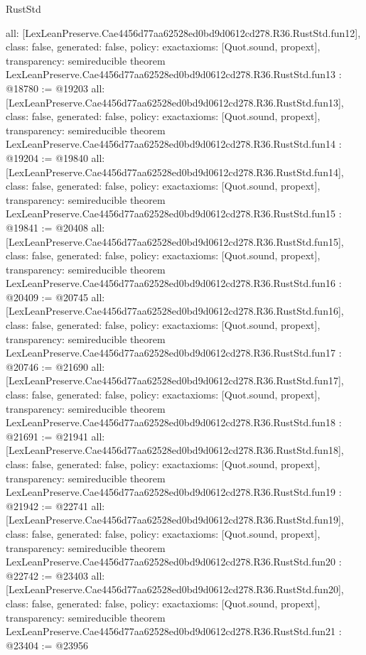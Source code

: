 \begin{lexlean}{RustStd}
\begin{coremodule}
{  all: [LexLeanPreserve.Cae4456d77aa62528ed0bd9d0612cd278.R36.RustStd.fun12],
  class: false,
  generated: false,
  policy: exact{axioms: [Quot.sound, propext]},
  transparency: semireducible
}
theorem LexLeanPreserve.Cae4456d77aa62528ed0bd9d0612cd278.R36.RustStd.fun13 : @18780 := @19203 {
  all: [LexLeanPreserve.Cae4456d77aa62528ed0bd9d0612cd278.R36.RustStd.fun13],
  class: false,
  generated: false,
  policy: exact{axioms: [Quot.sound, propext]},
  transparency: semireducible
}
theorem LexLeanPreserve.Cae4456d77aa62528ed0bd9d0612cd278.R36.RustStd.fun14 : @19204 := @19840 {
  all: [LexLeanPreserve.Cae4456d77aa62528ed0bd9d0612cd278.R36.RustStd.fun14],
  class: false,
  generated: false,
  policy: exact{axioms: [Quot.sound, propext]},
  transparency: semireducible
}
theorem LexLeanPreserve.Cae4456d77aa62528ed0bd9d0612cd278.R36.RustStd.fun15 : @19841 := @20408 {
  all: [LexLeanPreserve.Cae4456d77aa62528ed0bd9d0612cd278.R36.RustStd.fun15],
  class: false,
  generated: false,
  policy: exact{axioms: [Quot.sound, propext]},
  transparency: semireducible
}
theorem LexLeanPreserve.Cae4456d77aa62528ed0bd9d0612cd278.R36.RustStd.fun16 : @20409 := @20745 {
  all: [LexLeanPreserve.Cae4456d77aa62528ed0bd9d0612cd278.R36.RustStd.fun16],
  class: false,
  generated: false,
  policy: exact{axioms: [Quot.sound, propext]},
  transparency: semireducible
}
theorem LexLeanPreserve.Cae4456d77aa62528ed0bd9d0612cd278.R36.RustStd.fun17 : @20746 := @21690 {
  all: [LexLeanPreserve.Cae4456d77aa62528ed0bd9d0612cd278.R36.RustStd.fun17],
  class: false,
  generated: false,
  policy: exact{axioms: [Quot.sound, propext]},
  transparency: semireducible
}
theorem LexLeanPreserve.Cae4456d77aa62528ed0bd9d0612cd278.R36.RustStd.fun18 : @21691 := @21941 {
  all: [LexLeanPreserve.Cae4456d77aa62528ed0bd9d0612cd278.R36.RustStd.fun18],
  class: false,
  generated: false,
  policy: exact{axioms: [Quot.sound, propext]},
  transparency: semireducible
}
theorem LexLeanPreserve.Cae4456d77aa62528ed0bd9d0612cd278.R36.RustStd.fun19 : @21942 := @22741 {
  all: [LexLeanPreserve.Cae4456d77aa62528ed0bd9d0612cd278.R36.RustStd.fun19],
  class: false,
  generated: false,
  policy: exact{axioms: [Quot.sound, propext]},
  transparency: semireducible
}
theorem LexLeanPreserve.Cae4456d77aa62528ed0bd9d0612cd278.R36.RustStd.fun20 : @22742 := @23403 {
  all: [LexLeanPreserve.Cae4456d77aa62528ed0bd9d0612cd278.R36.RustStd.fun20],
  class: false,
  generated: false,
  policy: exact{axioms: [Quot.sound, propext]},
  transparency: semireducible
}
theorem LexLeanPreserve.Cae4456d77aa62528ed0bd9d0612cd278.R36.RustStd.fun21 : @23404 := @23956 {
}
\end{coremodule}
\end{lexlean}
